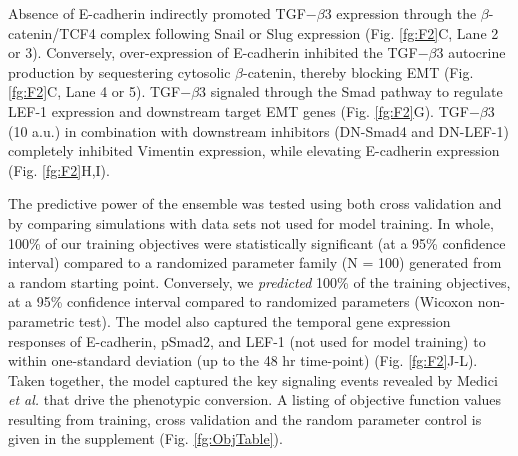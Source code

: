 \documentclass[12pt]{article}
\begin{document}
Absence of E-cadherin indirectly promoted TGF$-\beta$3 expression through the $\beta$-catenin/TCF4 complex following Snail or Slug expression (Fig. \ref{fg:F2}C, Lane 2 or 3).
Conversely, over-expression of E-cadherin inhibited the TGF$-\beta$3 autocrine production by sequestering cytosolic $\beta$-catenin, thereby blocking EMT (Fig. \ref{fg:F2}C, Lane 4 or 5).
TGF$-\beta$3 signaled through the Smad pathway to regulate LEF-1 expression and downstream target EMT genes (Fig. \ref{fg:F2}G).
TGF$-\beta$3 (10 a.u.) in combination with downstream inhibitors (DN-Smad4 and DN-LEF-1) completely inhibited Vimentin expression, while elevating E-cadherin expression (Fig. \ref{fg:F2}H,I).

The predictive power of the ensemble was tested using both cross validation and by comparing simulations with data sets not used for model training.
In whole, 100\% of our training objectives were statistically significant (at a 95\% confidence interval) compared to a randomized parameter family (N = 100)
generated from a random starting point. Conversely, we \emph{predicted} 100\% of the training objectives, at a 95\% confidence interval compared to randomized parameters (Wicoxon non-parametric test).
The model also captured the temporal gene expression responses of E-cadherin, pSmad2, and LEF-1 (not used for model training) to within one-standard deviation (up to the 48 hr time-point) (Fig. \ref{fg:F2}J-L). Taken together, the model captured the key signaling events revealed by Medici \emph{et al.} \citep{Medici:2008fk} that drive the phenotypic conversion.
A listing of objective function values resulting from training, cross validation and the random parameter control is given in the supplement (Fig. \ref{fg:ObjTable}).
\end{document}
